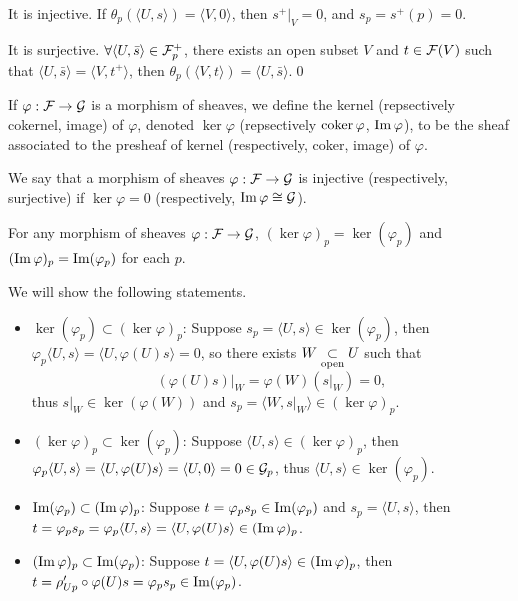 \documentclass[12pt]{extbook}
\begin{document}
It is injective. If $\theta_p(\langle U,s\rangle)=\langle V,0\rangle$, then $s^+|_V=0$, and $s_p=s^+(p)=0$.

It is surjective. $\forall \langle U,\bar{s}\rangle\in \mathcal{F}^+_p$, there exists an open subset $V$ and $t\in \mathcal{F}(V)$ such that $\langle U,\bar{s}\rangle=\langle V,t^+\rangle$, then $\theta_p(\langle V,t\rangle)=\langle U,\bar{s}\rangle$.\qed

\para If $\varphi:\mathcal{F}\to\mathcal{G}$ is a morphism of sheaves, we define the kernel (repsectively cokernel, image) of $\varphi$, denoted $\ker \varphi$ (repsectively $\operatorname{coker} \varphi$, $\operatorname{Im} \varphi$), to be the sheaf associated to the presheaf of kernel (respectively, coker, image) of $\varphi$.

\para We say that a morphism of sheaves $\varphi:\mathcal{F}\to\mathcal{G}$ is injective (respectively, surjective) if $\ker\varphi=0$ (respectively, $\operatorname{Im}\varphi\cong\mathcal{G}$).

\pro  \label{pro:5} For any morphism of sheaves $\varphi:\mathcal{F}\to\mathcal{G}$, $(\ker \varphi)_p=\ker(\varphi_p)$ and $(\operatorname{Im} \varphi)_p=\operatorname{Im}(\varphi_p)$ for each $p$.

\proof We will show the following statements.
	\begin{itemize}
		\item $\ker(\varphi_p)\subset (\ker \varphi)_p$: Suppose $s_p=\langle U,s\rangle\in \ker(\varphi_p)$, then $\varphi_p\langle U,s\rangle=\langle U,\varphi(U)s\rangle=0$, so there exists $W\underset{\mathrm{open}}{\subset} U$ such that 
		\[
			(\varphi(U)s)|_W=\varphi(W)(s|_W)=0,
		\]
		thus $s|_W\in \ker(\varphi(W))$ and $s_p=\langle W,s|_W\rangle\in (\ker \varphi)_p$.

		\item $(\ker \varphi)_p\subset\ker(\varphi_p)$: Suppose $\langle U,s\rangle\in (\ker \varphi)_p$, then $\varphi_p\langle U,s\rangle=\langle U,\varphi(U)s\rangle=\langle U,0\rangle=0\in \mathcal{G}_p$, thus $\langle U,s\rangle\in \ker(\varphi_p)$.

		\item $\operatorname{Im}(\varphi_p)\subset (\operatorname{Im} \varphi)_p$: Suppose $t=\varphi_ps_p\in\operatorname{Im} (\varphi_p)$ and $s_p=\langle U,s\rangle$, then $t=\varphi_ps_p=\varphi_p\langle U,s\rangle=\langle U,\varphi(U)s\rangle\in (\operatorname{Im} \varphi)_p$.

		\item $(\operatorname{Im} \varphi)_p\subset \operatorname{Im}(\varphi_p)$: Suppose $t=\langle U,\varphi(U)s\rangle\in (\operatorname{Im} \varphi)_p$, then $t=\rho'_{Up}\circ\varphi(U)s=\varphi_p s_p \in \operatorname{Im}(\varphi_p)$.
	\end{itemize}
\end{document}
